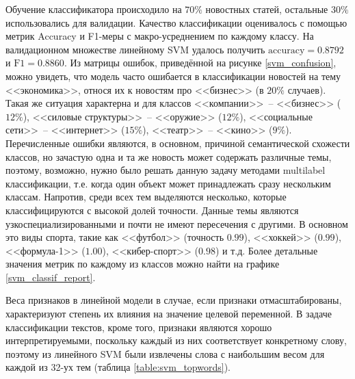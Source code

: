 \documentclass[a4paper, 14pt]{extarticle}
\begin{document}
Обучение классификатора происходило на $70\%$ новостных статей, остальные $30\%$ использовались для валидации.
Качество классификации оценивалось с помощью метрик Accuracy и F1-меры с макро-усреднением по каждому классу.
На валидационном множестве линейному SVM удалось получить $\text{accuracy} = 0.8792$ и $\text{F1} = 0.8860$. Из матрицы ошибок,
приведённой на рисунке \ref{svm_confusion}, можно увидеть, что модель часто ошибается в классификации новостей на тему <<экономика>>, относя их
к новостям про <<бизнес>> (в $20\%$ случаев). Такая же ситуация характерна и для классов <<компании>>~-- <<бизнес>> ($12\%$), <<силовые 
структуры>>~-- <<оружие>> ($12\%$),  <<социальные сети>>~-- <<интернет>> ($15\%$), <<театр>>~-- <<кино>> ($9\%$). Перечисленные ошибки
являются, в основном, причиной семантической схожести классов, но зачастую одна и та же новость может содержать различные темы, поэтому,
возможно, нужно было решать данную задачу методами multilabel классификации, т.е. когда один объект может принадлежать сразу
нескольким классам. Напротив, среди всех тем выделяются несколько, которые классифицируются с высокой долей точности. Данные темы являются
узкоспециализированными и почти не имеют пересечения с другими. В основном это виды спорта, такие как <<футбол>> (точность $0.99$), <<хоккей>> 
($0.99$), <<формула-1>> ($1.00$), <<кибер-спорт>> ($0.98$) и т.д. Более детальные
значения метрик по каждому из классов можно найти на графике \ref{svm_classif_report}.

Веса признаков в линейной модели в случае, если признаки отмасштабированы, характеризуют степень их влияния на значение целевой переменной.
В задаче классификации текстов, кроме того, признаки являются хорошо интерпретируемыми, поскольку каждый из них соответствует конкретному слову,
поэтому из линейного SVM были извлечены слова с наибольшим весом для каждой из 32-ух тем (таблица \ref{table:svm_topwords}). 
%
%
%
%
%
%
%
%
\end{document}

